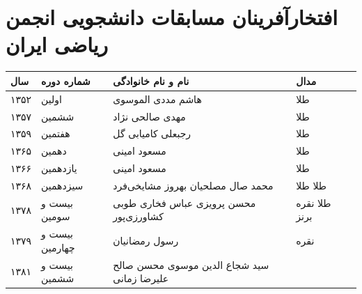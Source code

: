 \documentclass[
  letterpaper,
  DIV=11,
  numbers=noendperiod]{scrreprt}
\newcounter{none} %
\begin{document}
\section{افتخارآفرینان مسابقات دانشجویی انجمن ریاضی
ایران}\label{ux627ux641ux62aux62eux627ux631ux622ux641ux631ux6ccux646ux627ux646-ux645ux633ux627ux628ux642ux627ux62a-ux62fux627ux646ux634ux62cux648ux6ccux6cc-ux627ux646ux62cux645ux646-ux631ux6ccux627ux636ux6cc-ux627ux6ccux631ux627ux646}

{\def\LTcaptype{none} %
\begin{longtable}[]{@{}
  >{\raggedright\arraybackslash}p{}
  >{\raggedright\arraybackslash}p{}
  >{\raggedright\arraybackslash}p{}
  >{\raggedright\arraybackslash}p{}
  >{\raggedright\arraybackslash}p{}@{}}
\toprule\noalign{}
\begin{minipage}[b]{\linewidth}\raggedright
سال
\end{minipage} & \begin{minipage}[b]{\linewidth}\raggedright
شماره دوره
\end{minipage} & \begin{minipage}[b]{\linewidth}\raggedright
نام و نام خانوادگی
\end{minipage} & \begin{minipage}[b]{\linewidth}\raggedright
مدال
\end{minipage} & \begin{minipage}[b]{\linewidth}\raggedright
\end{minipage} \\
\midrule\noalign{}
\endhead
\bottomrule\noalign{}
\endlastfoot
۱۳۵۲ & اولین & هاشم مددی الموسوی & طلا & \\
۱۳۵۷ & ششمین & مهدی صالحی نژاد & طلا & \\
۱۳۵۹ & هفتمین & رجبعلی کامیابی گل & طلا & \\
۱۳۶۵ & دهمین & مسعود امینی & طلا & \\
۱۳۶۶ & یازدهمین & مسعود امینی & طلا & \\
۱۳۶۸ & سیزدهمین & محمد صال مصلحیان بهروز مشایخی‌فرد & طلا طلا & \\
۱۳۷۸ & بیست و سومین & محسن پرویزی عباس فخاری طوبی کشاورزی‌پور & طلا نقره
برنز & \\
۱۳۷۹ & بیست و چهارمین & رسول رمضانیان & نقره & \\
۱۳۸۱ & بیست و ششمین & سید شجاع الدین موسوی محسن صالح علیرضا زمانی

\end{longtable}}
\end{document}
